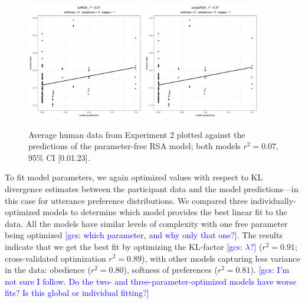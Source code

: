 \documentclass[10pt,a4paper]{article}
\newcommand{\gcs}[1]{\textcolor{blue}{[gcs: #1]}}
\begin{document}
\begin{figure}[ht]
	\centering
	\includegraphics[width=2in]{images/x3_m1.pdf}
	\includegraphics[width=2in]{images/x3_m7.pdf}
	\caption{Average human data from Experiment 2 plotted against the predictions of the parameter-free RSA model; both models $r^{2}=0.07$, 95\% CI [0.01.23].}\label{simple-full-x3}
\end{figure}



To fit model parameters, we again optimized values with respect to KL divergence estimates between the participant data and the model predictions---in this case for utterance preference distributions.  We compared three individually-optimized models to determine which model provides the best linear fit to the data. All the models have similar levels of complexity with one free parameter being optimized \gcs{which parameter, and why only that one?}. The results indicate that we get the best fit by optimizing the KL-factor \gcs{$\lambda$?} ($r^{2}=0.91$; cross-validated optimization $r^{2}=0.89$), with other models capturing less variance in the data: obedience ($r^{2}=0.80$), softness of preferences ($r^{2}=0.81$). \gcs{I'm not sure I follow. Do the two- and three-parameter-optimized models have worse fits? Is this global or individual fitting?}
\end{document}
